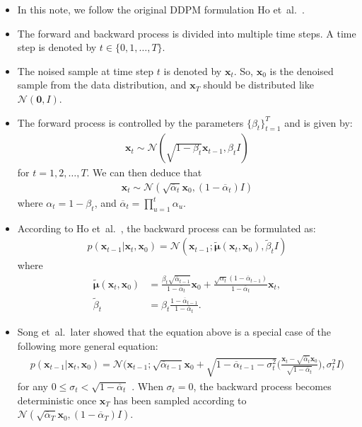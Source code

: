 \documentclass[10pt]{article}
\newcommand{\ve}[1]{\mathbf{#1}}
\newcommand{\ves}[1]{\boldsymbol{#1}}
\newcommand{\etal}{{et~al.}}
\newcommand{\mcal}[1]{\mathcal{#1}}
\newcommand{\ov}[1]{\overline{#1}}
\begin{document}
\begin{itemize}
  \item In this note, we follow the original DDPM formulation Ho \etal~\cite{Ho:2020}.

  \item The forward and backward process is divided into multiple time steps. A time step is denoted by $t \in \{0, 1, \dotsc, T\}$.
  
  \item The noised sample at time step $t$ is denoted by $\ve{x}_t$. So, $\ve{x}_0$ is the denoised sample from the data distribution, and $\ve{x}_T$ should be distributed like $\mcal{N}(\ve{0},I)$.
  
  \item The forward process is controlled by the parameters $\{ \beta_t \}_{t=1}^T$ and is given by:
  \begin{align*}
    \ve{x}_{t} \sim \mcal{N}(\sqrt{1 - \beta_t} \ve{x}_{t-1}, \beta_t I)
  \end{align*}
  for $t = 1, 2, \dotsc, T$. We can then deduce that
  \begin{align*}
    \ve{x}_t \sim \mcal{N}(\sqrt{\ov{\alpha}_t}\ve{x}_0, (1 - \ov{\alpha}_t) I)
  \end{align*}
  where $\alpha_t = 1 - \beta_t$, and $\ov{\alpha}_t = \prod_{u=1}^t \alpha_u$.

  \item According to Ho \etal~\cite{Ho:2020}, the backward process can be formulated as:
  \begin{align*}
    p(\ve{x}_{t-1}|\ve{x}_t, \ve{x}_0) = \mcal{N}(\ve{x}_{t-1}; \widetilde{\ves{\mu}}(\ve{x}_t, \ve{x}_0), \widetilde{\beta}_t I)
  \end{align*}
  where
  \begin{align} \label{eqn:ddim-backward-process}
    \widetilde{\ves{\mu}}(\ve{x}_t, \ve{x}_0) 
    &= \frac{\beta_t \sqrt{\ov{\alpha}_{t-1}}}{1 - \ov{\alpha}_t} \ve{x}_0 + \frac{\sqrt{\alpha_t}(1 - \ov{\alpha}_{t-1})}{1 - \ov{\alpha}_t} \ve{x}_t, \\
    \widetilde{\beta}_t &= \beta_t \frac{1 - \ov{\alpha}_{t-1}}{1 - \ov{\alpha}_t}.
  \end{align}

  \item Song \etal\ later showed that the equation above is a special case of the following more general equation:
  \begin{align*}
    p(\ve{x}_{t-1}|\ve{x}_t,\ve{x}_0) = \mcal{N}\bigg( \ve{x}_{t-1} ; \sqrt{\ov{\alpha}_{t-1}}\ve{x}_0 + \sqrt{1 - \ov{\alpha}_{t-1} - \sigma_t^2}\bigg( \frac{\ve{x}_t - \sqrt{\ov{\alpha}_t}\ve{x}_0}{\sqrt{1 - \ov{\alpha}_t}} \bigg), \sigma_t^2 I \bigg)
  \end{align*}
  for any $0 \leq \sigma_t < \sqrt{1 - \ov{\alpha}_t}$ \cite{Song:DDIM:2020}. When $\sigma_t = 0$, the backward process becomes deterministic once $\ve{x}_T$ has been sampled according to $\mcal{N}(\sqrt{\ov{\alpha}_T} \ve{x}_0, (1 - \ov{\alpha}_T) I)$.


\end{itemize}
\end{document}
